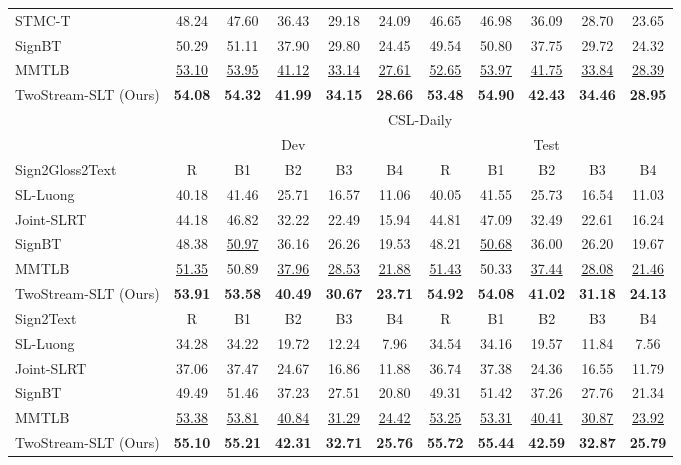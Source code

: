 \documentclass{article}
\begin{document}
\begin{table}[t]
{\begin{tabular}{l|c c c c c|c c c c c}
    STMC-T~\cite{STMC_MM} &48.24 & 47.60 & 36.43 & 29.18 & 24.09 & 46.65 & 46.98 & 36.09 & 28.70 & 23.65 \\
    SignBT~\cite{zhou2021improving} & 50.29 & 51.11 & 37.90 & 29.80 & 24.45 & 49.54 & 50.80 & 37.75 & 29.72 & 24.32 \\
    MMTLB~\cite{MMTLB_2022} &\underline{53.10} & \underline{53.95} & \underline{41.12} & \underline{33.14} & \underline{27.61} & \underline{52.65} & \underline{53.97} & \underline{41.75} & \underline{33.84} & \underline{28.39} \\
    TwoStream-SLT (Ours) &\textbf{54.08}&\textbf{54.32}&\textbf{41.99}&\textbf{34.15}&\textbf{28.66}&\textbf{53.48}&\textbf{54.90}&\textbf{42.43}&\textbf{34.46}&\textbf{28.95}\\ 
    \bottomrule
    \toprule
& \multicolumn{10}{c}{CSL-Daily}  \\
    &\multicolumn{5}{c|}{Dev}& \multicolumn{5}{c}{Test}\\
    Sign2Gloss2Text&R&B1&B2&B3&B4&R&B1&B2&B3&B4\\
    \midrule
    SL-Luong~\cite{camgoz2018neural} & 40.18 & 41.46 & 25.71 & 16.57 & 11.06 & 40.05 & 41.55 & 25.73 & 16.54 & 11.03 \\
    Joint-SLRT~\cite{camgoz2020sign} & 44.18 & 46.82 & 32.22 & 22.49 & 15.94 & 44.81 & 47.09 & 32.49 & 22.61 & 16.24 \\
    SignBT~\cite{zhou2021improving} & 48.38 & \underline{50.97} & 36.16 & 26.26 & 19.53 & 48.21 & \underline{50.68} & 36.00 & 26.20 & 19.67 \\
    MMTLB~\cite{MMTLB_2022} & \underline{51.35} & 50.89 & \underline{37.96} & \underline{28.53} & \underline{21.88} & \underline{51.43} & 50.33 & \underline{37.44} & \underline{28.08} & \underline{21.46} \\
    TwoStream-SLT (Ours) &  \textbf{53.91} & \textbf{53.58} & \textbf{40.49} & \textbf{30.67} & \textbf{23.71} & \textbf{54.92} & \textbf{54.08} & \textbf{41.02} & \textbf{31.18} & \textbf{24.13} \\
    \midrule
    Sign2Text&R&B1&B2&B3&B4&R&B1&B2&B3&B4\\
    \midrule
    SL-Luong~\cite{camgoz2018neural} & 34.28 & 34.22 & 19.72 & 12.24 & 7.96 & 34.54 & 34.16 & 19.57 & 11.84 & 7.56 \\
    Joint-SLRT~\cite{camgoz2020sign} & 37.06 & 37.47 & 24.67 & 16.86 & 11.88 & 36.74 & 37.38 & 24.36 & 16.55 & 11.79 \\
    SignBT~\cite{zhou2021improving} & 49.49 & 51.46 & 37.23 & 27.51 & 20.80 & 49.31 & 51.42 & 37.26 & 27.76 & 21.34 \\
    MMTLB~\cite{MMTLB_2022} & \underline{53.38} & \underline{53.81} & \underline{40.84} & \underline{31.29} & \underline{24.42} & \underline{53.25} & \underline{53.31} & \underline{40.41} & \underline{30.87} & \underline{23.92} \\
    TwoStream-SLT (Ours) &\textbf{55.10}&\textbf{55.21}&\textbf{42.31}&\textbf{32.71}&\textbf{25.76}&\textbf{55.72}&\textbf{55.44}&\textbf{42.59}&\textbf{32.87}&\textbf{25.79}\\
    \bottomrule
    \end{tabular}}
\end{table}
\end{document}
